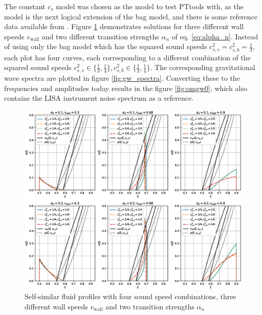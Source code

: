 The constant $c_s$ model was chosen as the model to test PTtools with,
as the model is the next logical extension of the bag model,
and there is some reference data available from \cites{giese_2020}{giese_2021}.
Figure \ref{fig:fluid_profiles} demonstrates solutions for three different wall speeds $v_\text{wall}$ and two different transition strengths $\alpha_n$ of eq. \eqref{eq:alpha_n}.
Instead of using only the bag model which has the squared sound speeds $c_{s,s}^2 = c_{s,b}^2 = \frac{1}{3}$,
each plot has four curves, each corresponding to a different combination of the squared sound speeds
$c_{s,s}^2 \in \{ \frac{1}{3}, \frac{1}{4} \}, c_{s,b}^2 \in \{ \frac{1}{3}, \frac{1}{4} \}$.
The corresponding gravitational wave spectra are plotted in figure \ref{fig:gw_spectra}.
Converting these to the frequencies and amplitudes today results in the figure \ref{fig:omgw0},
which also contains the LISA instrument noise spectrum as a reference.

\begin{figure}[ht!]
\centering
\includegraphics[width=\textwidth]{msc2-python/fig/const_cs_gw_v.eps}
\caption{Self-similar fluid profiles with four sound speed combinations, three different wall speeds $v_\text{wall}$ and two transition strengths $\alpha_n$}
\label{fig:fluid_profiles}
\end{figure}

